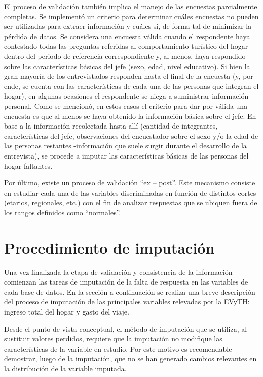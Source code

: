 \documentclass[
  openany]{book}
\begin{document}
El proceso de validación también implica el manejo de las encuestas parcialmente completas. Se implementó un criterio para determinar cuáles encuestas no pueden ser utilizadas para extraer información y cuáles si, de forma tal de minimizar la pérdida de datos. Se considera una encuesta válida cuando el respondente haya contestado todas las preguntas referidas al comportamiento turístico del hogar dentro del periodo de referencia correspondiente y, al menos, haya respondido sobre las características básicas del jefe (sexo, edad, nivel educativo). Si bien la gran mayoría de los entrevistados responden hasta el final de la encuesta (y, por ende, se cuenta con las características de cada una de las personas que integran el hogar), en algunas ocasiones el respondente se niega a suministrar información personal. Como se mencionó, en estos casos el criterio para dar por válida una encuesta es que al menos se haya obtenido la información básica sobre el jefe. En base a la información recolectada hasta allí (cantidad de integrantes, características del jefe, observaciones del encuestador sobre el sexo y/o la edad de las personas restantes -información que suele surgir durante el desarrollo de la entrevista), se procede a imputar las características básicas de las personas del hogar faltantes.

Por último, existe un proceso de validación ``ex -- post''. Este mecanismo consiste en estudiar cada una de las variables discriminadas en función de distintos cortes (etarios, regionales, etc.) con el fin de analizar respuestas que se ubiquen fuera de los rangos definidos como ``normales''.

\hypertarget{procedimiento-de-imputaciuxf3n}{%
\section{Procedimiento de imputación}\label{procedimiento-de-imputaciuxf3n}}

Una vez finalizada la etapa de validación y consistencia de la información comienzan las tareas de imputación de la falta de respuesta en las variables de cada base de datos. En la sección a continuación se realiza una breve descripción del proceso de imputación de las principales variables relevadas por la EVyTH: ingreso total del hogar y gasto del viaje.

Desde el punto de vista conceptual, el método de imputación que se utiliza, al sustituir valores perdidos, requiere que la imputación no modifique las características de la variable en estudio. Por este motivo es recomendable demostrar, luego de la imputación, que no se han generado cambios relevantes en la distribución de la variable imputada.
\end{document}
